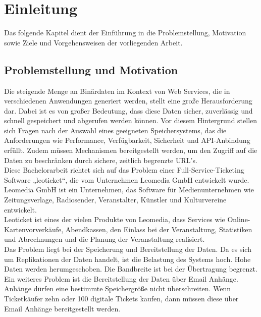 \chapter{Einleitung}

Das folgende Kapitel dient der Einführung in die Problemstellung, Motivation sowie Ziele und Vorgehensweisen der vorliegenden Arbeit.

\section{Problemstellung und Motivation}

Die steigende Menge an Binärdaten im Kontext von Web Services, die in verschiedenen Anwendungen generiert werden, stellt eine große Herausforderung dar. Dabei ist es von großer Bedeutung, dass diese Daten sicher, zuverlässig und schnell gespeichert und abgerufen werden können. Vor diesem Hintergrund stellen sich Fragen nach der Auswahl eines geeigneten Speichersystems, das die Anforderungen wie Performance, Verfügbarkeit, Sicherheit und API-Anbindung erfüllt.  Zudem müssen Mechanismen bereitgestellt werden, um den Zugriff auf die Daten zu beschränken durch sichere, zeitlich begrenzte URL’s.\\

Diese Bachelorarbeit richtet sich auf das Problem einer Full-Service-Ticketing Software „leoticket“, die vom Unternehmen Leomedia GmbH entwickelt wurde. 
Leomedia GmbH ist ein Unternehmen, das Software für Medienunternehmen wie Zeitungsverlage, Radiosender, Veranstalter, Künstler und Kulturvereine entwickelt. \textcite{leomedia-web}\\
Leoticket ist eines der vielen Produkte von Leomedia, dass Services wie Online-Kartenvorverkäufe, Abendkassen, den Einlass bei der Veranstaltung, Statistiken und Abrechnungen und die Planung der Veranstaltung realisiert.\textcite{leomedia-web}\\ 


Das Problem liegt bei der Speicherung und Bereitstellung der Daten. Da es sich um Replikationen der Daten handelt, ist die Belastung des Systems hoch. Hohe Daten werden herumgeschoben. Die Bandbreite ist bei der Übertragung begrenzt. Ein weiteres Problem ist die Bereitstellung der Daten über Email Anhänge. Anhänge dürfen eine bestimmte Speichergröße nicht überschreiten. Wenn Ticketkäufer zehn oder 100 digitale Tickets kaufen, dann müssen diese über Email Anhänge bereitgestellt werden.\\

